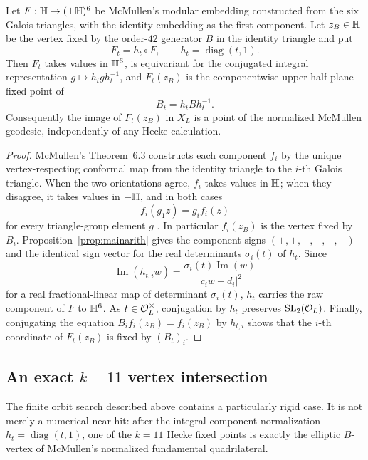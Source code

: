 \begin{proposition}\label{prop:geometricB}
Let $F:\mathbb H\to(\pm\mathbb H)^6$ be McMullen's modular embedding constructed from the six Galois triangles, with the identity embedding as the first component.  Let $z_B\in\mathbb H$ be the vertex fixed by the order-$42$ generator $B$ in the identity triangle and put
\[
 F_t=h_t\circ F,\qquad h_t=\operatorname{diag}(t,1).
\]
Then $F_t$ takes values in $\mathbb H^6$, is equivariant for the conjugated integral representation $g\mapsto h_tgh_t^{-1}$, and $F_t(z_B)$ is the componentwise upper-half-plane fixed point of
\[
 B_t=h_tBh_t^{-1}.
\]
Consequently the image of $F_t(z_B)$ in $X_L$ is a point of the normalized McMullen geodesic, independently of any Hecke calculation.
\end{proposition}
\begin{proof}
McMullen's Theorem~6.3 constructs each component $f_i$ by the unique vertex-respecting conformal map from the identity triangle to the $i$-th Galois triangle.  When the two orientations agree, $f_i$ takes values in $\mathbb H$; when they disagree, it takes values in $-\mathbb H$, and in both cases
\[
 f_i(g_1z)=g_i f_i(z)
\]
for every triangle-group element $g$ \cite[Thm.~6.3, Eq.~(6.1)]{McMullen2026}.  In particular $f_i(z_B)$ is the vertex fixed by $B_i$.  Proposition~\ref{prop:mainarith} gives the component signs $(+,+,-,-,-,-)$ and the identical sign vector for the real determinants $\sigma_i(t)$ of $h_t$.  Since
\[
 \operatorname{Im}(h_{t,i}w)=\frac{\sigma_i(t)\operatorname{Im}(w)}{|c_iw+d_i|^2}
\]
for a real fractional-linear map of determinant $\sigma_i(t)$, $h_t$ carries the raw component of $F$ to $\mathbb H^6$.  As $t\in\mathcal O_L^\times$, conjugation by $h_t$ preserves $\mathrm{SL}_2(\mathcal O_L)$.  Finally, conjugating the equation $B_i f_i(z_B)=f_i(z_B)$ by $h_{t,i}$ shows that the $i$-th coordinate of $F_t(z_B)$ is fixed by $(B_t)_i$.
\end{proof}

\subsection{An exact $k=11$ vertex intersection}\label{sec:vertexhit}
The finite orbit search described above contains a particularly rigid case.  It is not merely a numerical near-hit: after the integral component normalization $h_t=\operatorname{diag}(t,1)$, one of the $k=11$ Hecke fixed points is exactly the elliptic $B$-vertex of McMullen's normalized fundamental quadrilateral.

